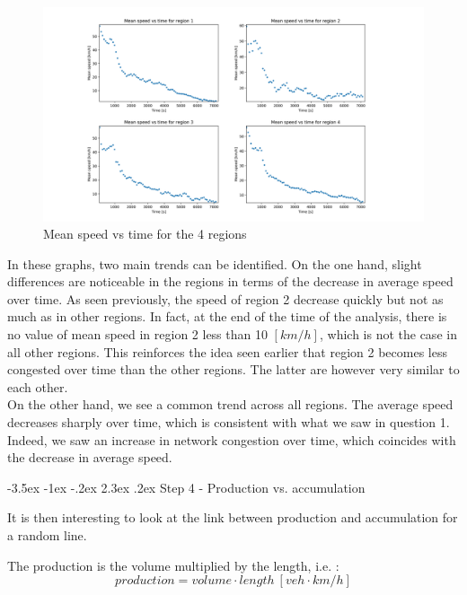\documentclass[a4paper, 12pt,oneside]{article}
\makeatletter
\renewcommand{\section}{\@startsection {section}{1}{\z@}%
             {-3.5ex \@plus -1ex \@minus -.2ex}%
             {2.3ex \@plus.2ex}%
             {\normalfont\normalsize\bfseries}}
\makeatother
\begin{document}
\begin{figure}[H]
    \begin{center}
        \includegraphics[width=18cm]{Images/Mean speed vs time for the 4 regions.png}
        \caption{Mean speed vs time for the 4 regions}
        \label{Mean speed vs time for the 4 regions}
    \end{center}
\end{figure}

In these graphs, two main trends can be identified.
On the one hand, slight differences are noticeable in the regions in terms of the decrease in average speed over time. As seen previously, the speed of region 2 decrease quickly but not as much as in other regions. In fact, at the end of the time of the analysis, there is no value of mean speed in region 2 less than 10 $[km/h]$, which is not the case in all other regions. This reinforces the idea seen earlier that region 2 becomes less congested over time than the other regions. The latter are however very similar to each other.\\
On the other hand, we see a common trend across all regions. The average speed decreases sharply over time, which is consistent with what we saw in question 1. Indeed, we saw an increase in network congestion over time, which coincides with the decrease in average speed.

\section{Step 4 - 
Production vs. accumulation}

It is then interesting to look at the link between production and accumulation for a random line.

The production is the volume multiplied by the length, i.e. :
\begin{equation}
       production =  volume \cdot length~[veh \cdot km/h]
    \label{production}
\end{equation}
\end{document}
